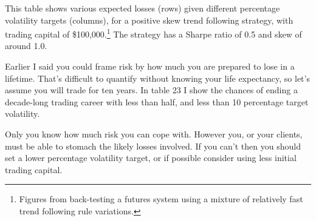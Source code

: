  \begingroup \small \centering
{}
\par \endgroup

This table shows various expected losses (rows) given different percentage volatility targets (columns), for a positive skew trend following strategy, with trading capital of \$100,000.\footnote{Figures from back-testing a futures system using a mixture of relatively fast trend following rule variations.} The strategy has a Sharpe ratio of 0.5 and skew of around 1.0.

Earlier I said you could frame risk by how much you are prepared to lose in a lifetime. That’s difficult to quantify without knowing your life expectancy, so let’s assume you will trade for ten years. In table 23 I show the chances of ending a decade-long trading
career with less than half, and less than 10%
percentage target volatility.

Only you know how much risk you can cope with. However you, or your clients, must be able to stomach the likely losses involved. If you can’t then you should set a lower percentage volatility target, or if possible consider using less initial trading capital.

 \begingroup \small \centering
{}
\par \endgroup

